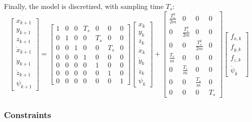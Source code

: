 \documentclass[a4paper, 12pt]{report}
\begin{document}
Finally, the model is discretized, with sampling time $T_s$:
\[\begin{bmatrix} x_{k+1} \\ y_{k+1} \\ z_{k+1} \\ \dot x_{k+1} \\ \dot y_{k+1} \\ \dot z_{k+1} \\ \psi_{k+1} \end{bmatrix}  = 
\begin{bmatrix}  1 & 0 & 0 & T_s & 0 & 0 & 0 \\ 0 & 1 & 0 & 0 & T_s & 0 & 0 \\ 0 & 0 & 1 & 0 & 0 & T_s & 0 \\ 0 & 0 & 0 & 1 & 0 & 0 & 0 \\ 0 & 0 & 0 & 0 & 1 & 0 & 0 \\ 0 & 0 & 0 & 0 & 0 & 1 & 0 \\ 0 & 0 & 0 & 0 & 0 & 0 & 1 \end{bmatrix} 
\begin{bmatrix} x_k \\ y_k \\ z_k \\ \dot x_k \\ \dot y_k \\ \dot z_k \\ \psi_k \end{bmatrix}  + \begin{bmatrix}  \frac{T^2_s}{2m} & 0 & 0 & 0 \\ 0 & \frac{T^2_s}{2m} & 0 & 0 \\ 0 & 0 & \frac{T^2_s}{2m} & 0 \\ \frac{T_s}{m} & 0 & 0 & 0 \\ 0 & \frac{T_s}{m} & 0 & 0 \\ 0 & 0 & \frac{T_s}{m} & 0 \\ 0 & 0 & 0 & T_s \end{bmatrix} \begin{bmatrix} f_{x,k} \\ f_{y,k} \\ f_{z,k} \\ \dot \psi_k \end{bmatrix} \]

\subsubsection{Constraints}

\newpage
\end{document}
